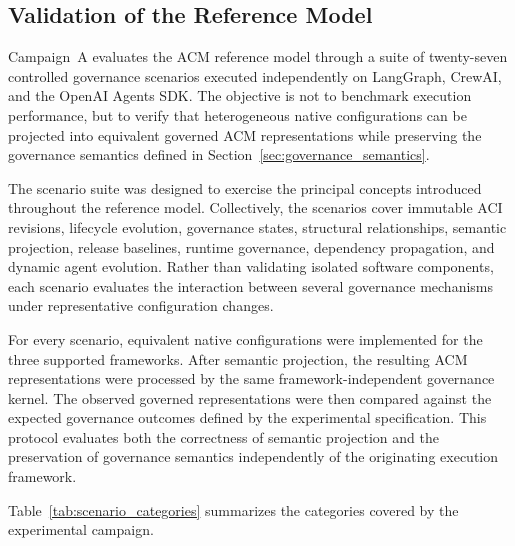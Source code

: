 \documentclass[10pt]{article}
\begin{document}
\subsection{Validation of the Reference Model}
\label{sec:reference_model_validation}

Campaign~A evaluates the ACM reference model through a suite of twenty-seven controlled governance scenarios executed independently on LangGraph, CrewAI, and the OpenAI Agents SDK. The objective is not to benchmark execution performance, but to verify that heterogeneous native configurations can be projected into equivalent governed ACM representations while preserving the governance semantics defined in Section~\ref{sec:governance_semantics}.

The scenario suite was designed to exercise the principal concepts introduced throughout the reference model. Collectively, the scenarios cover immutable ACI revisions, lifecycle evolution, governance states, structural relationships, semantic projection, release baselines, runtime governance, dependency propagation, and dynamic agent evolution. Rather than validating isolated software components, each scenario evaluates the interaction between several governance mechanisms under representative configuration changes.

For every scenario, equivalent native configurations were implemented for the three supported frameworks. After semantic projection, the resulting ACM representations were processed by the same framework-independent governance kernel. The observed governed representations were then compared against the expected governance outcomes defined by the experimental specification. This protocol evaluates both the correctness of semantic projection and the preservation of governance semantics independently of the originating execution framework.

Table~\ref{tab:scenario_categories} summarizes the categories covered by the experimental campaign.
\end{document}
